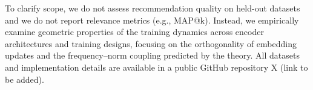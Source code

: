 To clarify scope, we do not assess recommendation quality on held-out datasets and we do not report relevance metrics (e.g., MAP@k). 
Instead, we empirically examine geometric properties of the training dynamics across encoder architectures and training designs, focusing on the orthogonality of embedding updates and the frequency–norm coupling predicted by the theory.
All datasets and implementation details are available in a public GitHub repository X (link to be added).




